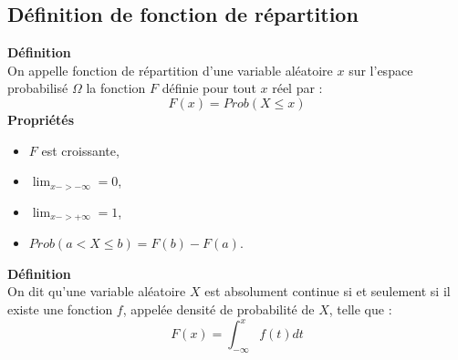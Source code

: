\documentclass[a4paper,11pt]{book}
\begin{document}
\subsection{D\'efinition de fonction de r\'epartition}
{\bf D\'efinition}\\
On appelle fonction de  r\'epartition d'une variable al\'eatoire $x$ sur 
l'espace probabilis\'e $\Omega$ la fonction $F$ d\'efinie pour tout $x$ r\'eel 
par :
$$F(x)=Prob(X\leq x)$$
{\bf Propri\'et\'es}\\
\begin{itemize}
\item $F$ est croissante,
\item $\lim_{x->-\infty}=0$,
\item $\lim_{x->+\infty}=1$,
\item $Prob(a< X\leq b)=F(b)-F(a)$.
\end{itemize}
{\bf D\'efinition}\\
On dit qu'une variable al\'eatoire $X$ est absolument continue si et seulement 
si il existe une fonction $f$, appel\'ee densit\'e de probabilit\'e de $X$,
telle que :
$$F(x)=\int_{-\infty}^xf(t)dt$$
\end{document}
